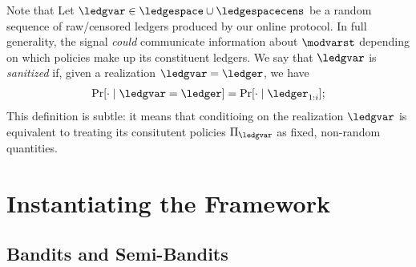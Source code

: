  Note that  Let $\ledgvar  \in \ledgespace \cup \ledgespacecens$ be a random sequence of  raw/censored ledgers produced by our online protocol.  In full generality, the signal \emph{could} communicate information about $\modvarst$ depending on which policies make up its constituent ledgers.  We say that $\ledgvar$ is  \emph{sanitized} if, given a realization $\ledgvar = \ledger$, we have
\begin{align*}
\Pr[\cdot \mid \ledgvar = \ledger] = \Pr[\cdot \mid  \ledger_{1:i}];
\end{align*}
This definition is subtle: it means that conditioing on the realization $\ledgvar$ is equivalent to treating its consitutent policies $\Pi_{\ledgvar}$ as fixed, non-random quantities. 



\section{Instantiating the Framework}








\newcommand{\Xmat}{X}
\newcommand{\rews}{r}
\newcommand{\ones}{\mathbf{1}}
\newcommand{\valvec}{\upnu}
\newcommand{\canvec}{\mathbf{e}}
\newcommand{\scrI}{\mathscr{I}}
\newcommand{\scrA}{\mathscr{A}}
\newcommand{\scrQ}{\mathscr{Q}}
\newcommand{\rd}[1][d]{\R^{#1}}
\newcommand{\calQ}{\mathcal{Q}}
\newcommand{\Qbar}{\widebar{Q}}
\newcommand{\calV}{\mathcal{V}}

\newcommand{\cexp}{c_{\mathrm{exp}}}
\newcommand{\inds}{\mathrm{inds}}

\newcommand{\support}{\mathrm{support}}
\newcommand{\Mquer}{\modclass^{\mathrm{quer}}}
\newcommand{\vecspan}{\mathrm{span}}


\subsection{Bandits and Semi-Bandits}


